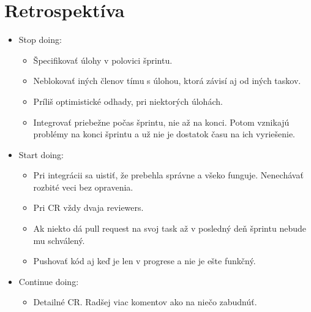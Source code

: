 \documentclass{article}
\begin{document}
    \section*{Retrospektíva}

        \begin{itemize}
            \item {Stop doing:}
                \begin{itemize}
                    \item {Špecifikovať úlohy v polovici šprintu.}
                    \item {Neblokovať iných členov tímu s úlohou, ktorá závisí aj od iných taskov.}
                    \item {Príliš optimistické odhady, pri niektorých úlohách.}
                    \item {Integrovať priebežne počas šprintu, nie až na konci. Potom vznikajú problémy na konci šprintu a už nie je dostatok času na ich vyriešenie.}
                \end{itemize}
            \item {Start doing:}
                \begin{itemize}
                    \item {Pri integrácii sa uistiť, že prebehla správne a všeko funguje. Nenechávať rozbité veci bez opravenia.}
                    \item {Pri CR vždy dvaja reviewers.}
                    \item {Ak niekto dá pull request na svoj task až v posledný deň šprintu nebude mu schválený.}
                    \item {Pushovať kód aj keď je len v progrese a nie je ešte funkčný.}
                \end{itemize}
            \item {Continue doing:}
                \begin{itemize}
                    \item {Detailné CR. Radšej viac komentov ako na niečo zabudnúť.}
                \end{itemize}
        \end{itemize}
\end{document}
